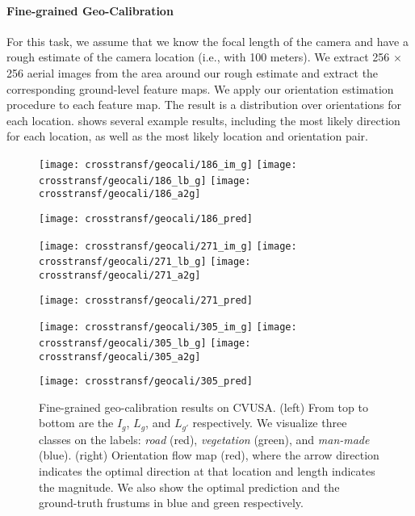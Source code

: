 \paragraph{Fine-grained Geo-Calibration}

For this task, we assume that we know the focal length of the camera
and have a rough estimate of the camera location (i.e., with 100
meters).  We extract 256 $\times$ 256 aerial images from the area
around our rough estimate and extract the corresponding ground-level
feature maps.  We apply our orientation estimation procedure to each
feature map.  The result is a distribution over orientations for each
location.   shows several example results,
including the most likely direction for each location, as well as the
most likely location and orientation pair.

\begin{figure*}
  \setlength{\aheight}{80pt}
  \setlength{\gwidth}{52pt}
  \centering
  \begin{minipage}[b]{\gwidth}
  \texttt{[image: crosstransf/geocali/186\_im\_g]}
  \texttt{[image: crosstransf/geocali/186\_lb\_g]}
  \texttt{[image: crosstransf/geocali/186\_a2g]}
  \end{minipage}
  \texttt{[image: crosstransf/geocali/186\_pred]}
  \hfill
  \begin{minipage}[b]{\gwidth}
  \texttt{[image: crosstransf/geocali/271\_im\_g]}
  \texttt{[image: crosstransf/geocali/271\_lb\_g]}
  \texttt{[image: crosstransf/geocali/271\_a2g]}
  \end{minipage}
  \texttt{[image: crosstransf/geocali/271\_pred]}
  \hfill
  \begin{minipage}[b]{\gwidth}
  \texttt{[image: crosstransf/geocali/305\_im\_g]}
  \texttt{[image: crosstransf/geocali/305\_lb\_g]}
  \texttt{[image: crosstransf/geocali/305\_a2g]}
  \end{minipage}
  \texttt{[image: crosstransf/geocali/305\_pred]}
  \hfill

  \caption{Fine-grained geo-calibration results on CVUSA. (left) From
top to bottom are the $I_g$, $L_g$, and $L_{g'}$ respectively.  We
visualize three classes on the labels: {\em road} (red), {\em
vegetation} (green), and {\em man-made} (blue).  (right) Orientation
flow map (red), where the arrow direction indicates the optimal
direction at that location and length indicates the magnitude. We also
show the optimal prediction and the ground-truth frustums in blue and
green respectively.}
  \label{fig:geocali:cali}
\end{figure*}

